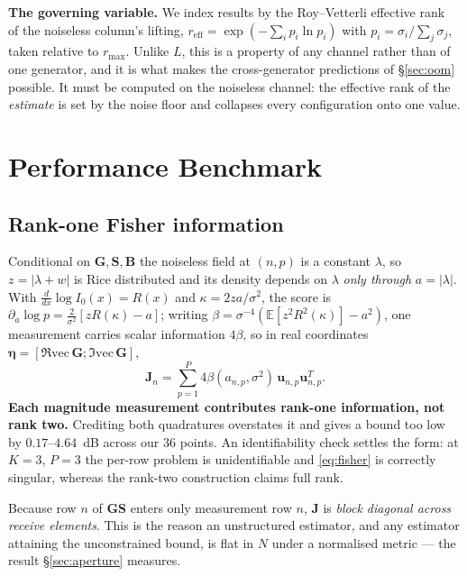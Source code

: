 \documentclass[journal]{IEEEtran}
\newcommand{\bG}{\mathbf{G}}
\newcommand{\bS}{\mathbf{S}}
\newcommand{\bB}{\mathbf{B}}
\newcommand{\bJ}{\mathbf{J}}
\newcommand{\reff}{r_{\mathrm{eff}}}
\newcommand{\rmax}{r_{\max}}
\begin{document}
\textbf{The governing variable.} We index results by the Roy--Vetterli
effective rank~\cite{royvetterli2007} of the noiseless
column's lifting, $\reff=\exp(-\sum_i p_i\ln p_i)$ with
$p_i=\sigma_i/\sum_j\sigma_j$, taken relative to $\rmax$. Unlike $L$, this is a
property of any channel rather than of one generator, and it is what makes the
cross-generator predictions of \S\ref{sec:oom} possible. It must be computed on
the noiseless channel: the effective rank of the \emph{estimate} is set by the
noise floor and collapses every configuration onto one value.

\section{Performance Benchmark}
\label{sec:crlb}

\subsection{Rank-one Fisher information}

Conditional on $\bG,\bS,\bB$ the noiseless field at $(n,p)$ is a constant
$\lambda$, so $z=|\lambda+w|$ is Rice distributed and its density depends on
$\lambda$ \emph{only through} $a=|\lambda|$. With
$\frac{d}{dx}\log I_0(x)=R(x)$ and $\kappa=2za/\sigma^2$, the score is
$\partial_a\log p=\frac{2}{\sigma^2}[zR(\kappa)-a]$; writing
$\beta=\sigma^{-4}(\mathbb{E}[z^2R^2(\kappa)]-a^2)$, one measurement carries
scalar information $4\beta$, so in real coordinates
$\boldsymbol\eta=[\Re\mathrm{vec}\,\bG;\Im\mathrm{vec}\,\bG]$,
\begin{equation}
\bJ_n=\sum_{p=1}^{P}4\beta(a_{n,p},\sigma^2)\,
\mathbf{u}_{n,p}\mathbf{u}_{n,p}^{T}.
\label{eq:fisher}
\end{equation}
\textbf{Each magnitude measurement contributes rank-one information, not rank
two.} Crediting both quadratures overstates it and gives a bound too low by
$0.17$--$4.64$~dB across our $36$ points. An identifiability check settles the
form: at $K=3$, $P=3$ the per-row problem is unidentifiable and
\eqref{eq:fisher} is correctly singular, whereas the rank-two construction
claims full rank.

Because row $n$ of $\bG\bS$ enters only measurement row $n$, $\bJ$ is
\emph{block diagonal across receive elements}. This is the reason an
unstructured estimator, and any estimator attaining the unconstrained bound, is
flat in $N$ under a normalised metric --- the result \S\ref{sec:aperture}
measures.
\end{document}
